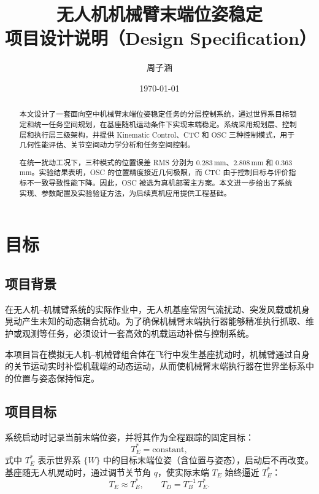 \documentclass[UTF8, a4paper, 12pt]{ctexart}
\title{\textbf{无人机机械臂末端位姿稳定\\项目设计说明（Design Specification）}}
\author{周子涵}
\date{\today}
\begin{document}
\maketitle

\begin{abstract}
本文设计了一套面向空中机械臂末端位姿稳定任务的分层控制系统，通过世界系目标锁定和统一任务空间规划，在基座随机运动条件下实现末端稳定。系统采用规划层、控制层和执行层三级架构，并提供 Kinematic Control、CTC 和 OSC 三种控制模式，用于几何性能评估、关节空间动力学分析和任务空间控制。

在统一扰动工况下，三种模式的位置误差 RMS 分别为 0.283\,mm、2.808\,mm 和 0.363\,mm。实验结果表明，OSC 的位置精度接近几何极限，而 CTC 由于控制目标与评价指标不一致导致性能下降。因此，OSC 被选为真机部署主方案。本文进一步给出了系统实现、参数配置及实验验证方法，为后续真机应用提供工程基础。
\end{abstract}

\clearpage
\tableofcontents
\clearpage

\section{目标}

\subsection{项目背景}

在无人机--机械臂系统的实际作业中，无人机基座常因气流扰动、突发风载或机身晃动产生未知的动态耦合扰动。为了确保机械臂末端执行器能够精准执行抓取、维护或观测等任务，必须设计一套高效的机载运动补偿与控制系统。

本项目旨在模拟无人机--机械臂组合体在飞行中发生基座扰动时，机械臂通过自身的关节运动实时补偿机载端的动态运动，从而使机械臂末端执行器在世界坐标系中的位置与姿态保持恒定。

\subsection{项目目标}

系统启动时记录当前末端位姿，并将其作为全程跟踪的固定目标：
\begin{equation}
    T_E^* = \text{constant},
    \label{eq:lock-target}
\end{equation}
式中 $T_E^*$ 表示世界系 $\{W\}$ 中的目标末端位姿（含位置与姿态），启动后不再改变。基座随无人机晃动时，通过调节关节角 $q$，使实际末端 $T_E$ 始终逼近 $T_E^*$：
\begin{equation}
    T_E \approx T_E^*, \qquad
    T_D = T_B^{-1}\, T_E^*.
    \label{eq:goal}
\end{equation}
\end{document}
